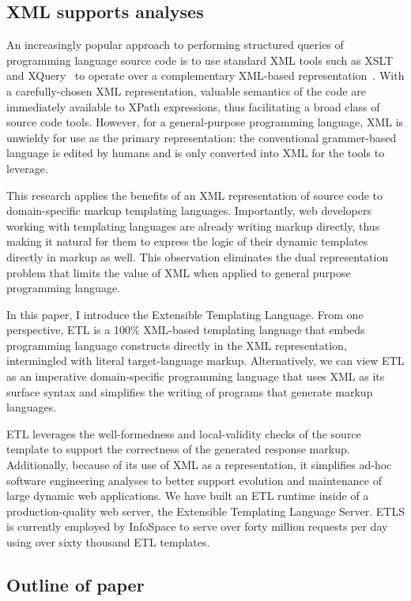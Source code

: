 \documentclass{www2003-submission}
\begin{document}
\subsection{XML supports analyses}

An increasingly popular approach to performing structured queries of
programming language source code is to use standard XML tools such as
XSLT~\cite{XSLT} and XQuery~\cite{XQuery} to operate over a
complementary XML-based representation~\cite{JavaML,others}.  With a
carefully-chosen XML representation, valuable semantics of the code
are immediately available to XPath expressions, thus facilitating a
broad class of source code tools.  However, for a general-purpose
programming language, XML is unwieldy for use as the primary
representation: the conventional grammer-based language is edited by
humans and is only converted into XML for the tools to leverage.

This research applies the benefits of an XML representation of source
code to domain-specific markup templating languages.  Importantly,
web developers working with templating languages are already writing
markup directly, thus making it natural for them to express the logic
of their dynamic templates directly in markup as well.  This
observation eliminates the dual representation problem that limits the
value of XML when applied to general purpose programming language.

In this paper, I introduce the Extensible Templating Language.  From
one perspective, ETL is a 100\% XML-based templating language that
embeds programming language constructs directly in the XML
representation, intermingled with literal target-language markup.
Alternatively, we can view ETL as an imperative domain-specific
programming language that uses XML as its surface syntax and
simplifies the writing of programs that generate markup languages.

ETL leverages the well-formedness and local-validity checks of the
source template to support the correctness of the generated response
markup.  Additionally, because of its use of XML as a representation,
it simplifies ad-hoc software engineering analyses to better support
evolution and maintenance of large dynamic web applications.  We have
built an ETL runtime inside of a production-quality web server, the
Extensible Templating Language Server.  ETLS is currently employed by
InfoSpace to serve over forty million requests per day using over
sixty thousand ETL templates.

\subsection{Outline of paper}
\end{document}
